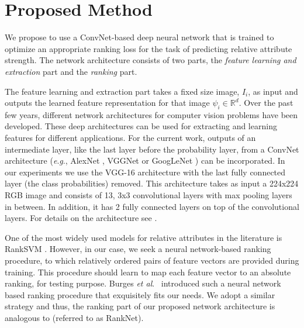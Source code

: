 \documentclass[runningheads]{llncs}
\newcommand{\etal}{\textit{et al}.}
\newcommand{\eg}{\textit{e}.\textit{g}.}
\begin{document}
\section{Proposed Method}
\label{sec.3}

We propose to use a ConvNet-based deep neural network that is trained to optimize an appropriate ranking loss for the task of predicting relative attribute strength. The network architecture consists of two parts, the \textit{feature learning and extraction} part and the \textit{ranking} part.

The feature learning and extraction part takes a fixed size image, $I_i$, as input and outputs the learned feature representation for that image $\psi_i \in \mathbb{R}^d$.
Over the past few years, different network architectures for computer vision problems have been developed. These deep architectures can be used for extracting and learning features for different applications.
For the current work, outputs of an intermediate layer, like the last layer before the probability layer, from a ConvNet architecture (\eg, AlexNet \cite{Krizhevsky2012ImageNetCW}, VGGNet \cite{verydeep} or GoogLeNet \cite{googlenet}) can be incorporated. %
In our experiments we use the VGG-16 architecture \cite{verydeep} with the last fully connected layer (the class probabilities) removed. This architecture takes as input a 224x224 RGB image and consists of 13, 3x3 convolutional layers with max pooling layers in between. In addition, it has 2 fully connected layers on top of the convolutional layers. For details on the architecture see \cite{verydeep}.

One of the most widely used models for relative attributes in the literature is RankSVM \cite{Joachims2002}. However,
in our case, we seek a neural network-based ranking procedure, to which relatively ordered pairs of feature vectors are provided during training. This procedure should learn to map each feature vector to an absolute ranking, for testing purpose. Burges \etal~\cite{Burges2005} introduced such a neural network based ranking procedure that exquisitely fits our needs. %
We adopt a similar strategy and thus, the ranking part of our proposed network architecture is analogous to \cite{Burges2005} (referred to as RankNet).
\end{document}

